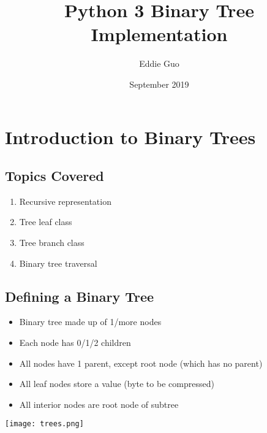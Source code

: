 \documentclass{article}
\title{Python 3 Binary Tree Implementation}
\author{Eddie Guo}
\date{September 2019}
\begin{document}
\lstset{language=Python}
\maketitle

\section{Introduction to Binary Trees}
\subsection{Topics Covered}
    \begin{multicols}{2}
        \begin{enumerate}[label=(\roman*)]
            \item Recursive representation
            \item Tree leaf class
            \item Tree branch class
            \item Binary tree traversal
        \end{enumerate}
    \end{multicols}

\subsection{Defining a Binary Tree}
    \begin{multicols}{2}
        \begin{itemize}
            \item Binary tree made up of 1/more nodes
            \item Each node has 0/1/2 children
            \item All nodes have 1 parent, except root node (which has no parent)
            \item All leaf nodes store a value (byte to be compressed)
            \item All interior nodes are root node of subtree
        \end{itemize}
    \end{multicols}
\begin{center}
    \texttt{[image: trees.png]}
\end{center}

\end{document}
